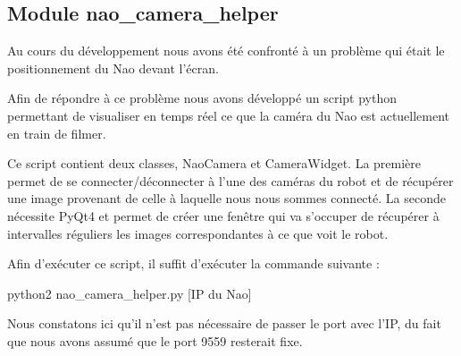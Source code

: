 \subsection{Module nao\_camera\_helper}
\label{sub:Module nao_camera_helper}
\par Au cours du développement nous avons été confronté à un problème qui était
le positionnement du Nao devant l'écran.
\par Afin de répondre à ce problème nous avons développé un
script python permettant de visualiser en temps réel ce que la caméra du Nao est
actuellement en train de filmer.
\par Ce script contient deux classes, NaoCamera et CameraWidget. La première
permet de se connecter/déconnecter à l'une des caméras du robot et de récupérer
une image provenant de celle à laquelle nous nous sommes connecté. La seconde
nécessite PyQt4 et permet de créer une fenêtre qui va s'occuper de récupérer à
intervalles réguliers les images correspondantes à ce que voit le robot.
\par Afin d'exécuter ce script, il suffit d'exécuter la commande suivante :
\begin{center}
	{python2 nao\_camera\_helper.py [IP du Nao]}
\end{center}
\par Nous constatons ici qu'il n'est pas nécessaire de passer le port avec l'IP,
du fait que nous avons assumé que le port 9559 resterait fixe.
